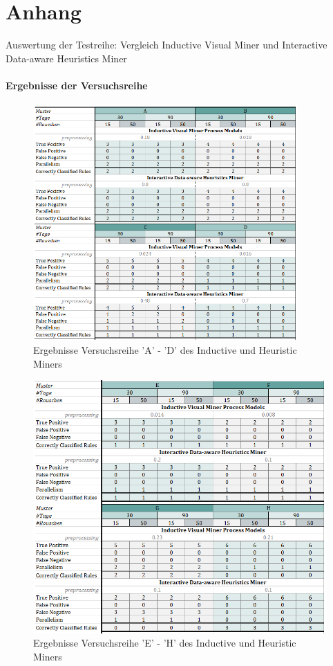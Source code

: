 \chapter*{Anhang} 
Auswertung der Testreihe: Vergleich Inductive Visual Miner und Interactive Data-aware Heuristics Miner
\captionsetup[table]{list=no}
\captionsetup[figure]{list=no}
\subsubsection{Ergebnisse der Versuchsreihe}\label{results}
\begin{figure}[!ht]
    \centering
    \includegraphics[width=0.9\textwidth]{figures/Appbildungen/tab1.PNG}
    \caption{Ergebnisse Versuchsreihe 'A' - 'D' des Inductive und Heuristic Miners}
    \label{tab1}
\end{figure}

\begin{figure}[!ht]
    \centering
    \includegraphics[width=\textwidth]{figures/Appbildungen/tab2.PNG}
    \caption{Ergebnisse Versuchsreihe 'E' - 'H' des Inductive und Heuristic Miners}
    \label{tab2}
\end{figure}

